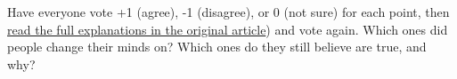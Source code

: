 Have everyone vote +1 (agree), -1 (disagree), or 0 (not sure) for each
point, then
\href{https://cacm.acm.org/blogs/blog-cacm/189498-top-10-myths-about-teaching-computer-science/fulltext}{read
  the full explanations in the original article}) and vote again.
Which ones did people change their minds on?  Which ones do they still
believe are true, and why?
